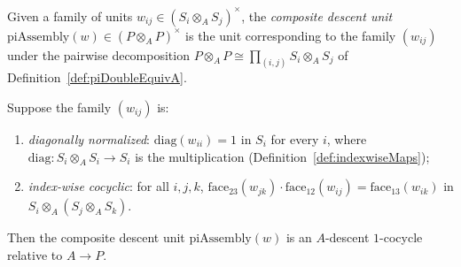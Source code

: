 \begin{definition}
  \label{def:piAssemblyUnit}
  \leanok
  Given a family of units \(w_{ij} \in (S_i \otimes_A S_j)^{\times}\), the \emph{composite
  descent unit} \(\mathrm{piAssembly}(w) \in (P \otimes_A P)^{\times}\) is the unit
  corresponding to the family \((w_{ij})\) under the pairwise decomposition
  \(P \otimes_A P \cong \prod_{(i,j)} S_i \otimes_A S_j\) of
  Definition~\ref{def:piDoubleEquivA}.
\end{definition}

\begin{theorem}
  \label{thm:isDescentCocycle_piAssemblyUnit}
  \leanok
  Suppose the family \((w_{ij})\) is:
  \begin{enumerate}
    \item \emph{diagonally normalized}: \(\mathrm{diag}(w_{ii}) = 1\) in \(S_i\) for every
      \(i\), where \(\mathrm{diag} \colon S_i \otimes_A S_i \to S_i\) is the multiplication
      (Definition~\ref{def:indexwiseMaps});
    \item \emph{index-wise cocyclic}: for all \(i, j, k\),
      \(\mathrm{face}_{23}(w_{jk}) \cdot \mathrm{face}_{12}(w_{ij}) =
      \mathrm{face}_{13}(w_{ik})\) in \(S_i \otimes_A (S_j \otimes_A S_k)\).
  \end{enumerate}
  Then the composite descent unit \(\mathrm{piAssembly}(w)\) is an \(A\)-descent
  \(1\)-cocycle relative to \(A \to P\).
\end{theorem}
